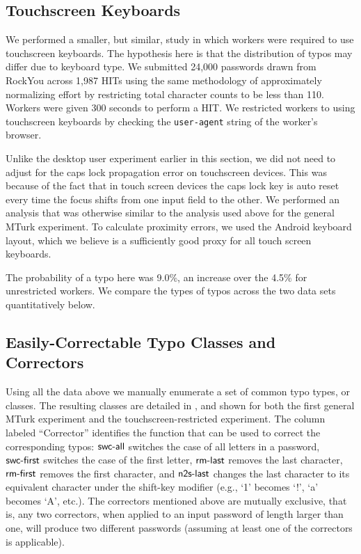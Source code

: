 \subsection{Touchscreen Keyboards}
We performed a smaller, but similar, study in which workers were
required to use touchscreen keyboards. The hypothesis here is that the
distribution of typos may differ due to keyboard type. We submitted
24,000 passwords drawn from RockYou across 1,987 HITs using the same
methodology of approximately normalizing effort by restricting total
character counts to be less than 110.  Workers were given 300 seconds
to perform a HIT. We restricted workers to using touchscreen keyboards
by checking the {\tt user-agent} string of the worker's browser.

Unlike the desktop user experiment earlier in this section, we did not need to
adjust for the caps lock propagation error on touchscreen devices. This was
because of the fact that in touch screen devices the caps lock key is auto reset
every time the focus shifts from one input field to the other. We performed an
analysis that was otherwise similar to the analysis used above for the general
MTurk experiment. To calculate proximity errors, we used the Android keyboard
layout, which we believe is a sufficiently good proxy for all touch screen
keyboards.  

The probability of a typo here was 9.0\%, an increase over the 4.5\%
for unrestricted workers.  We compare the types of typos across the
two data sets quantitatively below.
 

\subsection{Easily-Correctable Typo Classes and Correctors}

Using all the data above we manually enumerate a set of common typo
types, or classes.  The resulting classes are detailed in
, and shown for both the first general MTurk
experiment and the touchscreen-restricted experiment.  The column
labeled ``Corrector'' identifies the function that can be used to
correct the corresponding typos: $\textsf{swc-all}$ switches the case of all
letters in a password, $\textsf{swc-first}$ switches the case of the first
letter, $\textsf{rm-last}$ removes the last character, $\textsf{rm-first}$ removes the
first character, and $\textsf{n2s-last}$ changes the last character to its
equivalent character under the shift-key modifier (e.g., `1' becomes
`!', `a' becomes `A', etc.). The correctors mentioned above are
mutually exclusive, that is, any two correctors, when applied to an
input password of length larger than one, will produce two different
passwords (assuming at least one of the correctors is applicable).


